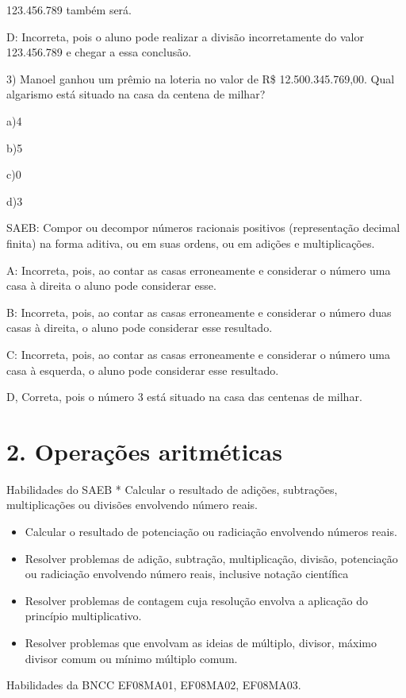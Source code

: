 123.456.789 também será.

D: Incorreta, pois o aluno pode realizar a divisão incorretamente do
valor 123.456.789 e chegar a essa conclusão.

3) Manoel ganhou um prêmio na loteria no valor de R\$ 12.500.345.769,00.
Qual algarismo está situado na casa da centena de milhar?

a)4

b)5

c)0

d)3

SAEB: Compor ou decompor números racionais positivos (representação
decimal finita) na forma aditiva, ou em suas ordens, ou em adições e
multiplicações.

A: Incorreta, pois, ao contar as casas erroneamente e considerar o
número uma casa à direita o aluno pode considerar esse.

B: Incorreta, pois, ao contar as casas erroneamente e considerar o
número duas casas à direita, o aluno pode considerar esse resultado.

C: Incorreta, pois, ao contar as casas erroneamente e considerar o
número uma casa à esquerda, o aluno pode considerar esse resultado.

D, Correta, pois o número 3 está situado na casa das centenas de milhar.


\section{2. Operações
aritméticas}

Habilidades do SAEB * Calcular o resultado de adições, subtrações,
multiplicações ou divisões envolvendo número reais.

\begin{itemize}
\item
  Calcular o resultado de potenciação ou radiciação envolvendo números
  reais.
\item
  Resolver problemas de adição, subtração, multiplicação, divisão,
  potenciação ou radiciação envolvendo número reais, inclusive notação
  científica
\item
  Resolver problemas de contagem cuja resolução envolva a aplicação do
  princípio multiplicativo.
\item
  Resolver problemas que envolvam as ideias de múltiplo, divisor, máximo
  divisor comum ou mínimo múltiplo comum.
\end{itemize}

Habilidades da BNCC EF08MA01, EF08MA02, EF08MA03.

